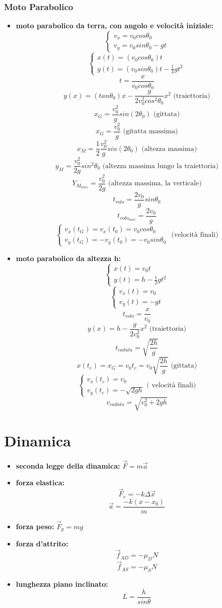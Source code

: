\documentclass[a4paper,12pt, oneside]{book}
\begin{document}
\subsubsection{Moto Parabolico}
\begin{itemize}
\item \textbf{moto parabolico da terra, con angolo e velocità iniziale:}
$$
\begin{cases}
v_x=v_0cos\theta_0\\
v_y=v_0sin\theta_0-gt
\end{cases}
$$
$$\begin{cases}
x(t)=(v_0cos\theta_0)t\\
y(t)=(v_0sin\theta_0)t-\frac{1}{2}gt^2
\end{cases}$$
$$t=\frac{x}{v_0cos\theta_0}$$
$$y(x)=(tan\theta_0)x-\frac{g}{2v_0^2cos^2\theta_0}x^2\mbox{ (traiettoria)}$$
$$x_G=\frac{v_0^2}{g}sin(2\theta_0)\mbox{ (gittata)}$$
$$x_G=\frac{v_0^2}{g}\mbox{ (gitatta massima)}$$
$$x_M=\frac{1}{2}\frac{v_0^2}{g}sin(2\theta_0)\mbox{ (altezza massima)}$$
$$y_M=\frac{v_0^2}{2g}sin^2\theta_0 \mbox{ (altezza massima lungo la traiettoria)}$$
$$Y_{M_{max}}=\frac{v_0^2}{2g}\mbox{ (altezza massima, la verticale)}$$
$$t_{volo}=\frac{2v_0}{g}sin\theta_0$$
$$t_{{volo}_{max}}=\frac{2v_0}{g}$$
$$\begin{cases}
v_x(t_G)=v_x(t_0)=v_0cos\theta_0\\
v_y(t_G)=-v_y(t_0)=-v_0sin\theta_0
\end{cases}\mbox{ (velocità finali)}$$
\item \textbf{moto parabolico da altezza h:}
$$\begin{cases}
x(t)=v_0t\\
y(t)=h-\frac{1}{2}gt^2
\end{cases}$$
$$\begin{cases}
v_x(t)=v_0\\
v_y(t)=-gt
\end{cases}$$
$$t_{volo}=\frac{x}{v_0}$$
$$y(x)=h-\frac{g}{2v_0^2}x^2\mbox{ (traiettoria)}$$
$$t_{caduta}=\sqrt{\frac{2h}{g}}$$
$$x(t_c)=x_G=v_0t_c=v_0\sqrt{\frac{2h}{g}}\mbox{ (gittata)}$$
$$\begin{cases}v_x(t_c)=v_0\\
v_y(t_c)=-\sqrt{2gh}\end{cases} \mbox{( velocità finali)}$$
$$v_{caduta}=\sqrt{v_0^2+2gh}$$
\end{itemize}
\section{Dinamica}
\begin{itemize}
\item \textbf{seconda legge della dinamica:} $\vec{F}=m\vec{a}$
\item \textbf{forza elastica:}
$$\vec{F}_e=-k\Delta \vec{x}$$
$$\vec{a}=\frac{-k(x-x_0)}{m}$$
\item \textbf{forza peso:}
$\vec{F}_p=mg$
\item \textbf{forza d'attrito:}
$$\vec{f}_{AD}=-\mu_DN$$
$$\vec{f}_{AS}=-\mu_SN$$
\item \textbf{lunghezza piano inclinato:} $$L=\frac{h}{sin\theta}$$
\end{itemize}
\end{document}
